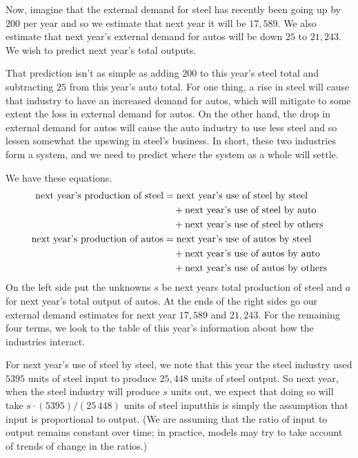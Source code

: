 Now, imagine that the external demand for steel has recently been going up by
$200$ per year and so we estimate that next year it will be $17,589$.
We also estimate that next year's 
external demand for autos will be down $25$ to $21,243$.
We wish to predict next year's total outputs.

That prediction isn't as simple as adding $200$ to this year's steel
total and subtracting $25$ from this year's auto total.
For one thing, a rise in steel will cause
that industry to have an increased demand for autos, which will mitigate
to some extent the loss in external demand for autos.
On the other hand, the drop in external demand for autos will cause
the auto industry to use less steel and so lessen somewhat the
upswing in steel's business.
In short, these two industries form a system, 
and we need to predict where the system as a whole will settle.

We have these equations.
\begin{align*}
  \text{next year's production of steel}
     &=\text{next year's use of steel by steel}   \\
     &\quad\hbox{}+\text{next year's use of steel by auto}  \\             
     &\quad\hbox{}+\text{next year's use of steel by others} \\
  \text{next year's production of autos}
     &=\text{next year's use of autos by steel}   \\
     &\quad\hbox{}+\text{next year's use of autos by auto}  \\             
     &\quad\hbox{}+\text{next year's use of autos by others} 
\end{align*}
On the left side put the unknowns 
$s$ be next years total production of steel and
$a$ for next year's total output of autos.
At the ends of the right sides go our external demand estimates for next 
year $17,589$ and $21,243$.
For the remaining four terms, we look to the table of this year's information
about how the industries interact.

For next year's use of steel by steel, we note that this year the
steel industry used $5395$ units of steel input to produce $25,448$ units of
steel output.
So next year, when the steel industry will produce $s$ units out, 
we expect that doing so will take $s\cdot (5395)/(25\,448)$
units of steel input\Dash this is simply the assumption that input is
proportional to output. 
(We are assuming that the ratio of input to output remains constant over time;
in practice, models may try to take account of trends of change in the
ratios.)

